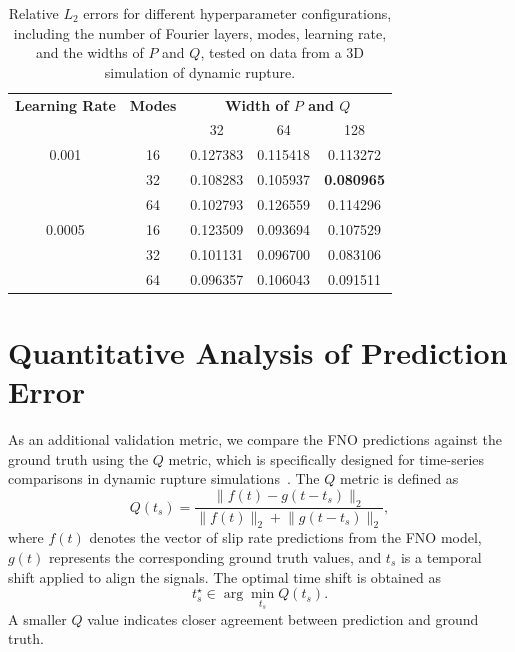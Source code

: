 \documentclass[draft]{agujournal2019}
\begin{document}
\begin{table}[ht!]
\caption{Relative \( L_2 \) errors for different hyperparameter configurations, including the number of Fourier layers, modes, learning rate, and the widths of \( P \) and \( Q \), tested on data from a 3D simulation of dynamic rupture.}
    \centering
    \begin{tabular}{ccccc}
        \toprule
        \textbf{Learning Rate} & \textbf{Modes} & \multicolumn{3}{c}{\textbf{Width of \(P\) and \(Q\)}} \\
        \cmidrule(lr){3-5}
        & & 32 & 64 & 128 \\
        \midrule
        0.001  & 16  & 0.127383 & 0.115418 & 0.113272  \\
               & 32  & 0.108283 & 0.105937 & \textbf{0.080965}  \\
               & 64  & 0.102793 & 0.126559 & 0.114296  \\
        0.0005 & 16  & 0.123509 & 0.093694  & 0.107529  \\
               & 32  & 0.101131 & 0.096700  & 0.083106  \\
               & 64  & 0.096357 & 0.106043 & 0.091511 \\
        \bottomrule
    \end{tabular}
    \label{tab:3D_hyperparam}
\end{table}

\section{Quantitative Analysis of Prediction Error}
\label{sec:appendix_c}

As an additional validation metric, we compare the FNO predictions against the ground truth using the \(Q\) metric, which is specifically designed for time-series comparisons in dynamic rupture simulations~\cite{barall2015metrics}. The \(Q\) metric is defined as
\begin{equation}
    Q(t_s) = 
    \frac{\lVert f(t) - g(t - t_s) \rVert_2}
         {\lVert f(t) \rVert_2 + \lVert g(t - t_s) \rVert_2},
    \label{Q}
\end{equation}
where \(f(t)\) denotes the vector of slip rate predictions from the FNO model, \(g(t)\) represents the corresponding ground truth values, and \(t_s\) is a temporal shift applied to align the signals. The optimal time shift is obtained as
\begin{equation}
    t_s^\star \in \arg\min_{t_s} Q(t_s).
    \label{t_s}
\end{equation}
A smaller \(Q\) value indicates closer agreement between prediction and ground truth.
\end{document}
